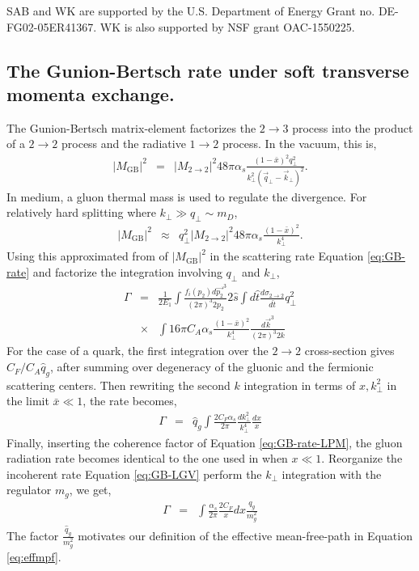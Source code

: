 \documentclass[aps, prc, reprint, amsmath, groupedaddress, nofootinbib]{revtex4-1}
\begin{document}
\begin{acknowledgments}
SAB and WK  are supported by the U.S. Department of Energy Grant no. DE-FG02-05ER41367. WK is also supported by NSF grant OAC-1550225.
\end{acknowledgments}

\begin{appendices}
\section{The Gunion-Bertsch rate under soft transverse momenta exchange.}
\label{app:consistency}
The Gunion-Bertsch matrix-element factorizes the $2\rightarrow3$ process into the product of a $2\rightarrow2$ process and the radiative $1\rightarrow 2$ process. 
In the vacuum, this is,
\begin{eqnarray}
|M_{\textrm{GB}}|^2 &=& |M_{2\rightarrow 2}|^2 48 \pi \alpha_s \frac{(1-\bar{x})^2q_\perp^2}{k_\perp^2\left(\vec{q}_\perp-\vec{k}_\perp\right)^2}.
\end{eqnarray}
In medium, a gluon thermal mass is used to regulate the divergence. 
For relatively hard splitting where $k_\perp \gg q_\perp \sim m_D$, 
\begin{eqnarray}
|M_{\textrm{GB}}|^2 &\approx & q_\perp^2 |M_{2\rightarrow 2}|^2 48 \pi \alpha_s \frac{(1-\bar{x})^2}{k_\perp^4}.
\end{eqnarray}
Using this approximated from of $|M_{\textrm{GB}}|^2$ in the scattering rate Equation \ref{eq:GB-rate} and factorize the integration involving $q_\perp$ and $k_\perp$,
\begin{eqnarray}
\Gamma &=& \frac{1}{2E_1}\int\frac{f_i(p_2)d\vec{p_2}^3}{(2\pi)^3 2p_2}2\hat{s}\int d\hat{t}\frac{d\sigma_{2\rightarrow 2}}{d\hat{t}}q_\perp^2
\nonumber \\
&\times& \int 16\pi C_A \alpha_s \frac{(1-\bar{x})^2}{k_\perp^4} \frac{d\vec{k}^3}{(2\pi)^3 2k}
\end{eqnarray}
For the case of a quark, the first integration over the $2\rightarrow 2$ cross-section gives $C_F/C_A\hat{q}_g$, after summing over degeneracy of the gluonic and the fermionic scattering centers.
Then rewriting the second $k$ integration in terms of $x, k_\perp^2$ in the limit $\bar{x}\ll 1$, the rate becomes,
\begin{eqnarray}\label{eq:GB-LGV}
\Gamma &=& \hat{q}_g \int \frac{2C_F\alpha_s}{2\pi} \frac{dk_\perp^2}{k_\perp^4} \frac{dx}{x}
\end{eqnarray}
Finally, inserting the coherence factor of Equation \ref{eq:GB-rate-LPM}, the gluon radiation rate becomes identical to the one used in \cite{Cao:2013ita} when $x\ll 1$.
Reorganize the incoherent rate Equation \ref{eq:GB-LGV} perform the $k_\perp$ integration with the regulator $m_g$, we get,
\begin{eqnarray}
\Gamma &=& \int \frac{\alpha_s}{2\pi} \frac{2C_F}{x}dx \frac{q_g}{m_g^2} 
\end{eqnarray}
The factor $\frac{\hat{q}_g}{m_g^2}$ motivates our definition of the effective mean-free-path in Equation \ref{eq:effmpf}.


\end{appendices}
\end{document}

